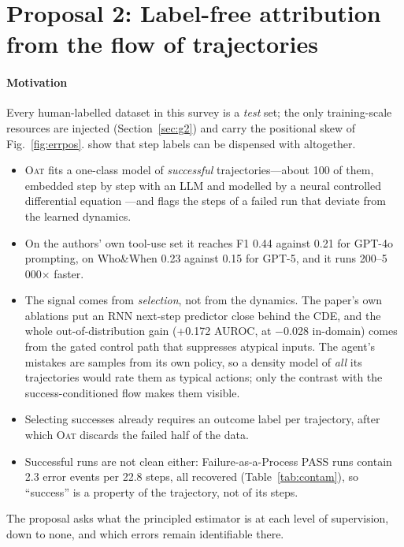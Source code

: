 \documentclass[10pt,a4paper]{article}
\begin{document}

\section{Proposal 2: Label-free attribution from the flow of trajectories}\label{sec:future:unsup}

\paragraph{Motivation} Every human-labelled dataset in this survey is a \emph{test} set; the only training-scale resources are injected (Section~\ref{sec:g2}) and carry the positional skew of Fig.~\ref{fig:errpos}. \citet{yeh2026oat} show that step labels can be dispensed with altogether.
\begin{itemize}[leftmargin=1.1em]
\item \textsc{Oat} fits a one-class model of \emph{successful} trajectories---about 100 of them, embedded step by step with an LLM and modelled by a neural controlled differential equation \cite{kidger2020ncde}---and flags the steps of a failed run that deviate from the learned dynamics.
\item On the authors' own tool-use set it reaches F1 0.44 against 0.21 for GPT-4o prompting, on Who\&When 0.23 against 0.15 for GPT-5, and it runs 200--5\,000$\times$ faster.
\item The signal comes from \emph{selection}, not from the dynamics. The paper's own ablations put an RNN next-step predictor close behind the CDE, and the whole out-of-distribution gain (+0.172 AUROC, at $-$0.028 in-domain) comes from the gated control path that suppresses atypical inputs. The agent's mistakes are samples from its own policy, so a density model of \emph{all} its trajectories would rate them as typical actions; only the contrast with the success-conditioned flow makes them visible.
\item Selecting successes already requires an outcome label per trajectory, after which \textsc{Oat} discards the failed half of the data.
\item Successful runs are not clean either: Failure-as-a-Process PASS runs contain 2.3 error events per 22.8 steps, all recovered (Table~\ref{tab:contam}), so ``success'' is a property of the trajectory, not of its steps.
\end{itemize}
The proposal asks what the principled estimator is at each level of supervision, down to none, and which errors remain identifiable there.
\end{document}
